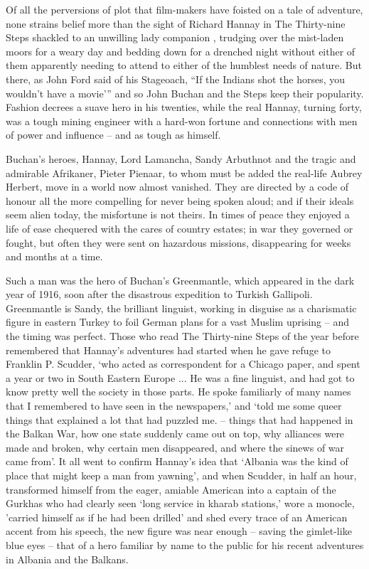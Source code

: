 
Of all the perversions of plot that film-makers have foisted on a tale of adventure, none strains belief more than the sight of Richard Hannay in The Thirty-nine Steps shackled to an unwilling lady companion , trudging over the mist-laden moors for a weary day and bedding down for a drenched night without either of them apparently needing to attend to either of the humblest needs of nature. But there, as John Ford said of his Stageoach, “If the Indians shot the horses, you wouldn’t have a movie’” and so John Buchan and the Steps keep their popularity. Fashion decrees a suave hero in his twenties, while the real Hannay, turning forty, was a tough mining engineer with a hard-won fortune and connections with men of power and influence – and as tough as himself.

Buchan’s heroes, Hannay, Lord Lamancha, Sandy Arbuthnot and the tragic and admirable Afrikaner, Pieter Pienaar, to whom must be added the real-life Aubrey Herbert, move in a world now almost vanished. They are directed by a code of honour all the more compelling for never being spoken aloud; and if their ideals seem alien today, the misfortune is not theirs. In times of peace they enjoyed a life of ease chequered with the cares of country estates; in war they governed or fought, but often they were sent on hazardous missions, disappearing for weeks and months at a time.

Such a man was the hero of Buchan’s Greenmantle, which appeared in the dark year of 1916, soon after the disastrous expedition to Turkish Gallipoli. Greenmantle is Sandy, the brilliant linguist, working in disguise as a charismatic figure in eastern Turkey to foil German plans for a vast Muslim uprising – and the timing was perfect. Those who read The Thirty-nine Steps of the year before remembered that Hannay’s adventures had started when he gave refuge to Franklin P. Scudder, ‘who acted as correspondent for a Chicago paper, and spent a year or two in South Eastern Europe ... He was a fine linguist, and had got to know pretty well the society in those parts. He spoke familiarly of many names that I remembered to have seen in the newspapers,’ and ‘told me some queer things that explained a lot that had puzzled me. – things that had happened in the Balkan War, how one state suddenly came out on top, why alliances were made and broken, why certain men disappeared, and where the sinews of war came from’. It all went to confirm Hannay’s idea that ‘Albania was the kind of place that might keep a man from yawning’, and when Scudder, in half an hour, transformed himself from the eager, amiable American into a captain of the Gurkhas who had clearly seen ‘long service in kharab stations,’ wore a monocle, 'carried himself as if he had been drilled’ and shed every trace of an American accent from his speech, the new figure was near enough – saving the gimlet-like blue eyes – that of a hero familiar by name to the public for his recent adventures in Albania and the Balkans.

